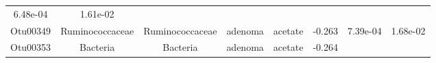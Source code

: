 \documentclass[11pt,]{article}
\begin{document}
\begin{longtable}[]{@{}cccccccc@{}}
\begin{minipage}[t]{0.08\columnwidth}
6.48e-04\strut
\end{minipage} & \begin{minipage}[t]{0.08\columnwidth}\centering\strut
1.61e-02\strut
\end{minipage}\tabularnewline
\begin{minipage}[t]{0.08\columnwidth}\centering\strut
Otu00349\strut
\end{minipage} & \begin{minipage}[t]{0.15\columnwidth}\centering\strut
Ruminococcaceae\strut
\end{minipage} & \begin{minipage}[t]{0.15\columnwidth}\centering\strut
Ruminococcaceae\strut
\end{minipage} & \begin{minipage}[t]{0.08\columnwidth}\centering\strut
adenoma\strut
\end{minipage} & \begin{minipage}[t]{0.09\columnwidth}\centering\strut
acetate\strut
\end{minipage} & \begin{minipage}[t]{0.07\columnwidth}\centering\strut
-0.263\strut
\end{minipage} & \begin{minipage}[t]{0.08\columnwidth}\centering\strut
7.39e-04\strut
\end{minipage} & \begin{minipage}[t]{0.08\columnwidth}\centering\strut
1.68e-02\strut
\end{minipage}\tabularnewline
\begin{minipage}[t]{0.08\columnwidth}\centering\strut
Otu00353\strut
\end{minipage} & \begin{minipage}[t]{0.15\columnwidth}\centering\strut
Bacteria\strut
\end{minipage} & \begin{minipage}[t]{0.15\columnwidth}\centering\strut
Bacteria\strut
\end{minipage} & \begin{minipage}[t]{0.08\columnwidth}\centering\strut
adenoma\strut
\end{minipage} & \begin{minipage}[t]{0.09\columnwidth}\centering\strut
acetate\strut
\end{minipage} & \begin{minipage}[t]{0.07\columnwidth}\centering\strut
-0.264\strut
\end{minipage} & \begin{minipage}[t]{0.08\columnwidth}\centering\strut

\end{minipage}
\end{longtable}
\end{document}

